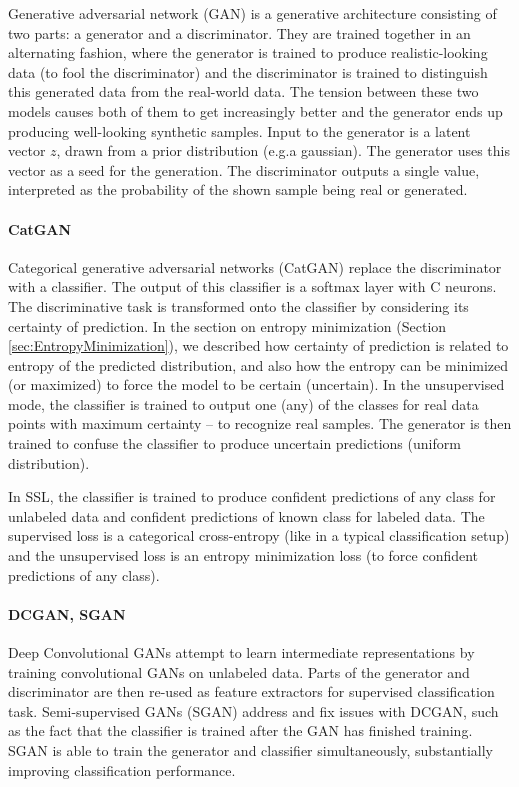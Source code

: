 Generative adversarial network (GAN) is a generative architecture consisting of two parts: a generator and a discriminator. They are trained together in an alternating fashion, where the generator is trained to produce realistic-looking data (to fool the discriminator) and the discriminator is trained to distinguish this generated data from the real-world data. The tension between these two models causes both of them to get increasingly better and the generator ends up producing well-looking synthetic samples. Input to the generator is a latent vector $z$, drawn from a prior distribution (e.g.\@ a gaussian). The generator uses this vector as a seed for the generation. The discriminator outputs a single value, interpreted as the probability of the shown sample being real or generated.

\paragraph*{CatGAN}
Categorical generative adversarial networks (CatGAN) replace the discriminator with a classifier. The output of this classifier is a softmax layer with C neurons. The discriminative task is transformed onto the classifier by considering its certainty of prediction. In the section on entropy minimization (Section \ref{sec:EntropyMinimization}), we described how certainty of prediction is related to entropy of the predicted distribution, and also how the entropy can be minimized (or maximized) to force the model to be certain (uncertain). In the unsupervised mode, the classifier is trained to output one (any) of the classes for real data points with maximum certainty -- to recognize real samples. The generator is then trained to confuse the classifier to produce uncertain predictions (uniform distribution).

In SSL, the classifier is trained to produce confident predictions of any class for unlabeled data and confident predictions of known class for labeled data. The supervised loss is a categorical cross-entropy (like in a typical classification setup) and the unsupervised loss is an entropy minimization loss (to force confident predictions of any class).

\paragraph*{DCGAN, SGAN}
Deep Convolutional GANs attempt to learn intermediate representations by training convolutional GANs on unlabeled data. Parts of the generator and discriminator are then re-used as feature extractors for supervised classification task. Semi-supervised GANs (SGAN) address and fix issues with DCGAN, such as the fact that the classifier is trained after the GAN has finished training. SGAN is able to train the generator and classifier simultaneously, substantially improving classification performance.

